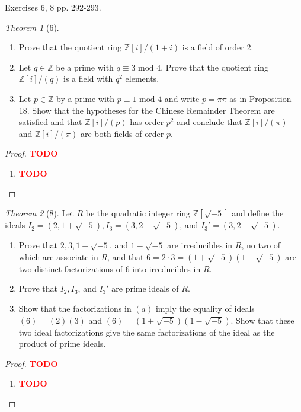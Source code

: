 \documentclass[12pt]{article}
\theoremstyle{remark}
\theoremstyle{named}
\newtheorem*{theorem}{Theorem}
\newcommand{\todo}{\textcolor{red}{\textbf{TODO} }}
\newcommand{\Z}{\mathbb Z}
\renewcommand{\mod}{\text{ mod }}
\begin{document}
Exercises 6, 8 pp. 292-293.

\begin{theorem}[6]

    \begin{enumerate}
        \item Prove that the quotient ring \(\Z [i] / (1 + i)\) is a field of order 2.
        \item Let \(q \in \Z\) be a prime with \(q \equiv 3 \mod 4\). Prove that the quotient ring \(\Z [i] / (q)\) is a field with \(q^2\) elements.
        \item Let \(p \in \Z\) by a prime with \(p \equiv 1 \mod 4\) and write \(p = \pi \overline{\pi}\) as in Proposition 18. Show that the hypotheses for the Chinese Remainder Theorem are satisfied and that \(\Z [i] / (p)\) has order \(p^2\) and conclude that \(\Z [i] / (\pi)\) and \(\Z [i] / (\overline{\pi})\) are both fields of order \(p\).
    \end{enumerate}
\end{theorem}

\begin{proof}
    \todo
    \begin{enumerate}
        \item \todo 
    \end{enumerate}
\end{proof}

\begin{theorem}[8]
    Let \(R\) be the quadratic integer ring \(\Z[\sqrt{-5}]\) and define the ideals \(I_2 = (2, 1 + \sqrt{-5}), I_3 = (3, 2 + \sqrt{-5})\), and \(I_3' = (3, 2 - \sqrt{-5})\). 
    \begin{enumerate}
        \item Prove that \(2, 3, 1 + \sqrt{-5}\), and \(1 - \sqrt{-5}\) are irreducibles in \(R\), no two of which are associate in \(R\), and that \(6 = 2 \cdot 3 = (1 + \sqrt{-5})(1 - \sqrt{-5})\) are two distinct factorizations of \(6\) into irreducibles in \(R\). 
        \item Prove that \(I_2, I_3\), and \(I_3'\) are prime ideals of \(R\). 
        \item Show that the factorizations in \((a)\) imply the equality of ideals \((6) = (2)(3)\) and \((6) = (1 + \sqrt{-5})(1 - \sqrt{-5})\). Show that these two ideal factorizations give the same factorizations of the ideal as the product of prime ideals.
    \end{enumerate}
\end{theorem}

\begin{proof}
    \todo
    \begin{enumerate}
        \item \todo 
    \end{enumerate}
\end{proof}
\end{document}
